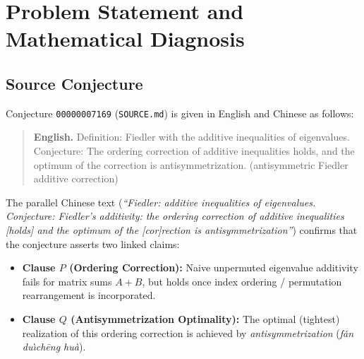 \documentclass[11pt,a4paper]{article}
\theoremstyle{plain}
\theoremstyle{definition}
\begin{document}
\section{Problem Statement and Mathematical Diagnosis}

\subsection{Source Conjecture}
Conjecture \texttt{00000007169} (\texttt{SOURCE.md}) is given in English and Chinese as follows:
\begin{quote}
\textbf{English.} Definition: Fiedler with the additive inequalities of eigenvalues. Conjecture: The ordering correction of additive inequalities holds, and the optimum of the correction is antisymmetrization. (antisymmetric Fiedler additive correction)
\end{quote}
The parallel Chinese text (\emph{``Fiedler: additive inequalities of eigenvalues. Conjecture: Fiedler's additivity: the ordering correction of additive inequalities [holds] and the optimum of the [cor]rection is antisymmetrization''}) confirms that the conjecture asserts two linked claims:
\begin{itemize}
  \item \textbf{Clause $P$ (Ordering Correction):} Naive unpermuted eigenvalue additivity fails for matrix sums $A + B$, but holds once index ordering / permutation rearrangement is incorporated.
  \item \textbf{Clause $Q$ (Antisymmetrization Optimality):} The optimal (tightest) realization of this ordering correction is achieved by \emph{antisymmetrization} (\emph{f\v{a}n du\`{\i}ch\={e}ng hu\`{a}}).
\end{itemize}
\end{document}
